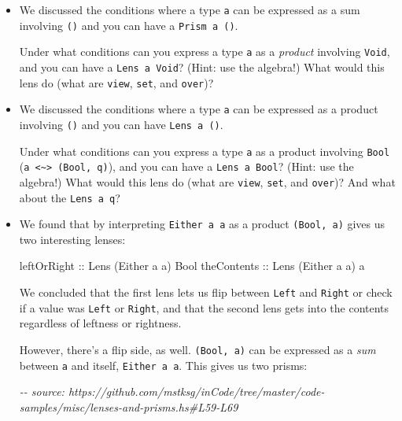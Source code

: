 \documentclass[]{article}
\newenvironment{Shaded}{}{}
\newcommand{\CommentTok}[1]{\textcolor[rgb]{0.38,0.63,0.69}{\textit{#1}}}
\newcommand{\DataTypeTok}[1]{\textcolor[rgb]{0.56,0.13,0.00}{#1}}
\newcommand{\NormalTok}[1]{#1}
\newcommand{\OtherTok}[1]{\textcolor[rgb]{0.00,0.44,0.13}{#1}}
\begin{document}
\begin{itemize}
\item
  We discussed the conditions where a type \texttt{a} can be expressed as a sum
  involving \texttt{()} and you can have a
  \texttt{Prism\textquotesingle{}\ a\ ()}.

  Under what conditions can you express a type \texttt{a} as a \emph{product}
  involving \texttt{Void}, and you can have a
  \texttt{Lens\textquotesingle{}\ a\ Void}? (Hint: use the algebra!) What would
  this lens do (what are \texttt{view}, \texttt{set}, and \texttt{over})?
\item
  We discussed the conditions where a type \texttt{a} can be expressed as a
  product involving \texttt{()} and you can have
  \texttt{Lens\textquotesingle{}\ a\ ()}.

  Under what conditions can you express a type \texttt{a} as a product involving
  \texttt{Bool}
  (\texttt{a\ \textless{}\textasciitilde{}\textgreater{}\ (Bool,\ q)}), and you
  can have a \texttt{Lens\textquotesingle{}\ a\ Bool}? (Hint: use the algebra!)
  What would this lens do (what are \texttt{view}, \texttt{set}, and
  \texttt{over})? And what about the \texttt{Lens\textquotesingle{}\ a\ q}?
\item
  We found that by interpreting \texttt{Either\ a\ a} as a product
  \texttt{(Bool,\ a)} gives us two interesting lenses:

\begin{Shaded}
\begin{Highlighting}[]
\OtherTok{leftOrRight ::} \DataTypeTok{Lens\textquotesingle{}}\NormalTok{ (}\DataTypeTok{Either}\NormalTok{ a a) }\DataTypeTok{Bool}
\OtherTok{theContents ::} \DataTypeTok{Lens\textquotesingle{}}\NormalTok{ (}\DataTypeTok{Either}\NormalTok{ a a) a}
\end{Highlighting}
\end{Shaded}

  We concluded that the first lens lets us flip between \texttt{Left} and
  \texttt{Right} or check if a value was \texttt{Left} or \texttt{Right}, and
  that the second lens gets into the contents regardless of leftness or
  rightness.

  However, there's a flip side, as well. \texttt{(Bool,\ a)} can be expressed as
  a \emph{sum} between \texttt{a} and itself, \texttt{Either\ a\ a}. This gives
  us two prisms:

\begin{Shaded}
\begin{Highlighting}[]
\CommentTok{{-}{-} source: https://github.com/mstksg/inCode/tree/master/code{-}samples/misc/lenses{-}and{-}prisms.hs\#L59{-}L69}


\end{Highlighting}
\end{Shaded}
\end{itemize}
\end{document}
